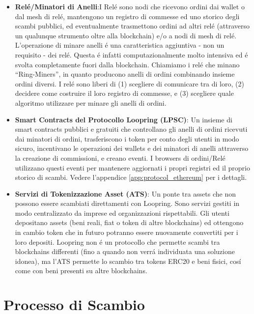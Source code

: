 \documentclass[UTF8,nofonts]{article}
\begin{document}
\begin{multicols}{2}
\begin{itemize}
\item \textbf{Rel\'e/Minatori di Anelli}:I Rel\'e sono nodi che ricevono ordini dai wallet o dal mesh di rel\'e, mantengono un registro di commesse ed uno storico degli scambi pubblici, ed eventualmente trasmettono ordini ad altri rel\'e (attraverso un qualunque strumento oltre alla blockchain) e/o a nodi di mesh di rel\'e. L'operazione di minare anelli \'e una caratteristica aggiuntiva - non un requisito - dei rel\'e. Questa \'e infatti computazionalmente molto intensiva ed \'e svolta completamente fuori dalla blockchain. Chiamiamo i rel\'e che minano \enquote{Ring-Miners}, in quanto producono anelli di ordini combinando insieme ordini diversi. I rel\'e sono liberi di (1) scegliere di comunicare tra di loro, (2) decidere come costruire il loro registro di commesse, e (3) scegliere quale algoritmo utilizzare per minare gli anelli di ordini.


\item \textbf{Smart Contracts del Protocollo Loopring (LPSC)}: Un insieme di smart contracts pubblici e gratuiti che controllano gli anelli di ordini ricevuti dai minatori di ordini, trasferiscono i token per conto degli utenti in modo sicuro, incentivano le operazioni dei wallets e dei minatori di anelli attraverso la creazione di commissioni, e creano eventi. I browsers di ordini/Rel\'e utilizzano questi eventi per mantenere aggiornati i propri registri ed il proprio storico di scambi. Vedere l'appendice \ref{app:protocol_ethereum} per i dettagli.

\item \textbf{Servizi di Tokenizzazione Asset (ATS)}: Un ponte tra assets che non possono essere scambiati direttamenti con Loopring. Sono servizi gestiti in modo centralizzato da imprese ed organizzazioni rispettabili. Gli utenti depositano assets (beni reali, fiat o token di altre blockchains) ed ottengono in cambio token che in futuro potranno essere nuovamente convertiti per i loro depositi. Loopring non \'e un protocollo che permette scambi tra blockchains differenti (fino a quando non verr\'a individuata una soluzione idonea), ma l'ATS permette lo scambio tra tokens ERC20 \cite{ERC20} e beni fisici, cos\'i come con beni presenti su altre blockchains.

\end{itemize}


\section{Processo di Scambio\label{sec:process}}




\end{multicols}
\end{document}
